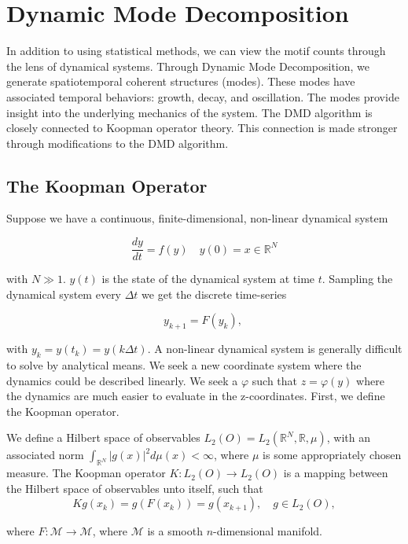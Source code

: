 \chapter{Dynamic Mode Decomposition}
In addition to using statistical methods, we can view the motif counts through the lens of dynamical systems. Through
Dynamic Mode Decomposition, we generate spatiotemporal coherent structures (modes). These modes have 
associated temporal behaviors: growth, decay, and oscillation. The modes provide insight into the 
underlying mechanics of the system. The DMD algorithm is closely connected
to Koopman operator theory. This connection is made stronger through modifications to the DMD algorithm.


\section{The Koopman Operator}
Suppose we have a continuous, finite-dimensional, non-linear dynamical system 

$$
\frac{dy}{dt} = f(y) \quad y(0) = x \in \mathbb{R}^N
$$

\noindent with $N\gg1$. $y(t)$ is the state of the dynamical system at time $t$. Sampling the dynamical
system every $\Delta t$ we get the discrete time-series

$$
y_{k+1} = F(y_k),\
$$

\noindent with $y_k = y(t_k) = y(k \Delta t)$. A non-linear dynamical system is 
generally difficult to solve by analytical means. We seek a new coordinate system where the dynamics could be
described linearly. We seek a $\varphi$ such
that $z = \varphi(y)$ where the dynamics are much easier to evaluate in the
 z-coordinates. First, we define the Koopman operator.

\vspace{0.12cm}

\begin{definition}
    We define a Hilbert space of observables $ L_2(O) = L_2(\mathbb{R}^N, \mathbb{R}, \mu)$, with an associated norm 
    $\int_{\mathbb{R}^N} |g(x) |^2 d\mu(x)  < \infty$, where $\mu$ is some appropriately chosen measure. The Koopman
    operator $K : L_2(O) \rightarrow L_2(O)$ is a mapping between the Hilbert space of observables unto itself, such that
    $$
    Kg(x_k) = g(F(x_k)) = g(x_{k+1}), \quad g \in L_2(O),
    $$

    \noindent where $F:\mathcal{M}\rightarrow \mathcal{M}$, where $\mathcal{M}$ is a smooth $n$-dimensional manifold.
\end{definition}

